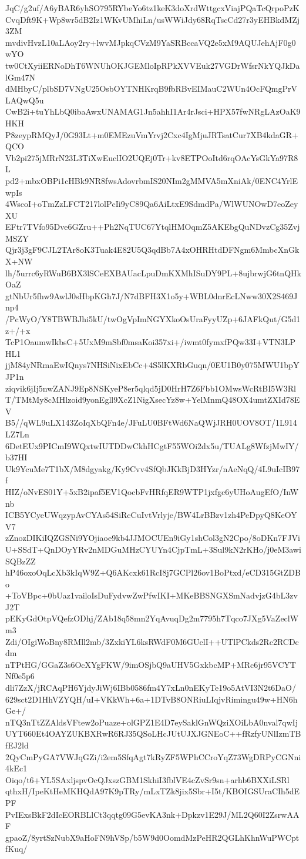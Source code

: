 JqC/g2uf/A6yBAR6yhSO795RYbeYo6tz1keK3doXrdWttgcxViajPQaTcQrpoPzK
CvqDft9K+Wp8wr5dB2Iz1WKvUMhiLn/usWWiJdy68RqTscCd27r3yEHBkdMZj3ZM
mvdivHvzL10aLAoy2ry+lwvMJpkqCVzM9YaSRBccaVQ2e5xM9AQUJehAjF0g0wYO
tw0CtXyiiERNoDhT6WNUhOKJGEMloIpRPkXVVEuk27VGDrWfsrNkYQJkDalGm47N
dMHbyC/plbSD7VNgU25OsbOYTNHKrqB9fbRBvEIMauC2WUn4OcFQmgPrVLAQwQ5u
CwB2i+tuYhLbQ0ibaAwxUNAMAG1Jn5ahhI1Ar4rJsci+HPX57fwNRgLAzOaK9HKH
P8zeypRMQyJ/0G93Lt+m0EMEzuVmYrvj2Cxc4IgMjuJRTsatCur7XB4kdaGR+QCO
Vb2pi275jMRrN23L3TiXwEuclIO2UQEj0Tr+kv8ETPOoItd6rqOAcYsGkYa97R8L
pd2+mbxOBPi1cHBk9NR8fwsAdovrbmIS20NIm2gMMVA5mXniAk/0ENC4YrlEwpIs
4WscoI+oTmZzLFCT217lolPcIi9yC89Qa6AiLtxE9SdmdPa/WlWUNOwD7eoZeyXU
EFtr7TVfo95Dve6GZru++Ph2NqTUC67YtqlHMOqmZ5AKEbgQuNDvzCg35ZvjMSZY
Qjr3j3gF9CJL2TAr8oK3Tuak4E82U5Q3qdBb7A4xOHRHtdDFNgm6MmbcXnGkX+NW
lh/5urrc6yRWuB6BX3lSCeEXBAUacLpuDmKXMhISuDY9PL+8ujbrwjG6tnQHkOaZ
gtNbUr5fhw9AwlJ0sHbpKGh7J/N7dBFH3X1o5y+WBL0dnrEcLNww30X2S469Jnp4
/PcWyO/Y8TBWBJhi5kU/twOgVpImNGYXkoOsUraFyyUZp+6JAFkQut/G5d1z+/+x
TcP1OaumwIkbsC+5UxM9mSbf0msaKoi357xi+/iwmt0fymxfPQw33I+VTN3LPHL1
jjM84yNRmaEwIQnys7NHSiNixEbCc+4S5lKXRbGuqn/0EU1B0y075MWU1bpYJP1n
ziqvik6jIj5nwZANJ9Ep8NSKyeP8er5qlqd5jD0HrH7Z6Fbb1OMwsWcRtBI5W3Rl
T/TMtMy8cMHlzoid9yonEgll9XcZ1NigXsecYz8w+YelMnmQ48OX4umtZXId78EV
B5//qWL9uLX143ZoIqXbQFn4e/JFuLU0BFtWd6NaQWjJRH0UOV8OT/1L914LZ7Ln
6DetEUx9PICmI9WQxtwIUTDDwCkhHCgtF55WOi2dx5u/TUALg8WfzjMwIY/b37HI
Uk9YcuMe7T1bX/M8dgyakg/Ky9Cvv4SfQbJKkBjD3HYzr/nAeNqQ/4L9uIcIB97f
HIZ/oNvES01Y+5xB2ipaf5EV1QocbFvHRfqER9WTP1jxfgc6yUHoAugEfO/InWnb
ICB5YCyeUWqzypAvCYAs54SiRcCuIvtVrlyje/BW4LrBBzv1zh4PeDpyQ8KeOYV7
zZnozDIKiIQZGSNi9YOjiaoe9kb4JJMOCUEn9iGy1shCol3gN2Cpo/8oDKn7FJVi
U+SSdT+QnDOyYRv2nMDGuMHzCYUYn4CjpTmL+3Sul9kN2rKHo/j0eM3awiSQBzZZ
hP46oxoOqLcXb3kIqW9Z+Q6AKcxk61RcI8j7GCPl26ov1BoPtxd/eCD315GtZDBo
+ToVBpc+0bUaz1vailoIsDuFydvwZwPfwIKI+MKeBBSNGXSmNadvjzG4bL3zvJ2T
pEKyGdOtpVQefzODhj/ZAb18q58mn2YqAvuqDg2m7795h7Tqco7JXg5VaZeclWm3
Zdi/OIgiWoBny8RMll2mb/3ZxkiYL6ksRWdF0M6GUclI++UTlPCkds2Rc2RCDcdm
nTPtHG/GGaZ3s6OcXYgFKW/9imOSjbQ9aUHV5GxkbcMP+MRc6jr95VCYTNf0e5p6
dli7ZzX/jRCAqPH6YjdyJiWj6IBb0586fm4Y7xLn0nEKyTe19o5AtVI3N2t6DaO/
629sct2D1HhVZYQH/uI+VKkWh+6a+1DTvB8ONRiuLIqjvRimingu49w+HN6hGe+/
nTQ3nTtZZAldsVFtew2oPuaze+olGPZ1E4D7eySaklGnWQziXOiLbA0nval7qwIj
UYT660Et4OAYZUKBXRwR6RJ35QSoLHcJUtUJXJGNEoC++fRzfyUNlIzmTBfEJ2ld
2QyCmPyGA7VWJqGZi/i2em5SfqAgt7kRyZF5WPhCCroYqZ73WgDRPyCGNni4kEc1
Oiqo/t6+YL5SAxljspvOcQJxszGBM1SkhiI3fblVE4cZvSr9sn+arhb6BXXiLSRl
qthxH/IpeKtHeMKHQdA97K9pTRy/mLxTZk8jix5Sbr+I5t/KBOIGSUraCIh5dEPF
PvIExsBkF2dIcEORBLlCt3qqtg09G5evKA3nk+Dpkzv1E29J/ML2Q60I2ZsrwAAF
gpaoZ/8yrtSzNubX9aHoFN9hVSp/b5W9d0OomdMzPeHR2QGLhKhnWuPWCptfKuq/
